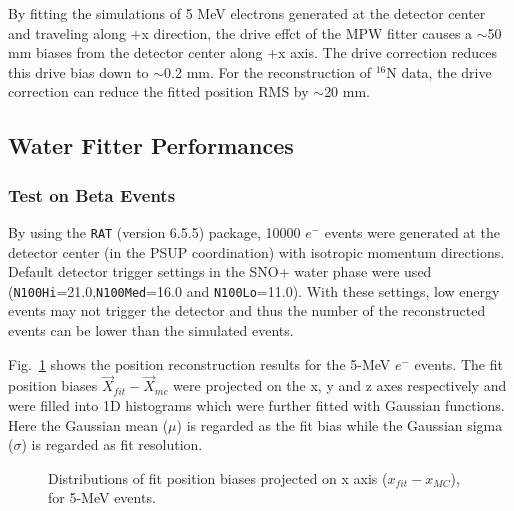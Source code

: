 By fitting the simulations of 5 MeV electrons generated at the detector center and traveling along +x direction, the drive effct of the MPW fitter causes a $\sim$50 mm biases from the detector center along +x axis. The drive correction reduces this drive bias down to $\sim$0.2 mm. For the reconstruction of $^{16}$N data, the drive correction can reduce the fitted position RMS by $\sim$20 mm.

\subsection{Water Fitter Performances}
\subsubsection{Test on Beta Events}
By using the \texttt{RAT} (version 6.5.5) package, 10000 $e^-$ events were generated at the detector center (in the PSUP coordination) with isotropic momentum directions. Default detector trigger settings in the SNO+ water phase were used (\texttt{N100Hi}=21.0,\texttt{N100Med}=16.0 and \texttt{N100Lo}=11.0). With these settings, low energy events may not trigger the detector and thus the number of the reconstructed events can be lower than the simulated events.

Fig.~\ref{fig:5MeVbeta_center_water} shows the position reconstruction results for the 5-MeV $e^-$ events. The fit position biases $\vec{X}_{fit}-\vec{X}_{mc}$ were projected on the x, y and z axes respectively and were filled into 1D histograms which were further fitted with Gaussian functions. Here the Gaussian mean ($\mu$) is regarded as the fit bias while the Gaussian sigma ($\sigma$) is regarded as fit resolution.
\begin{figure}[htbp]
	\centering \label{fig:5MeVbeta_center_water}
	\caption{Distributions of fit position biases projected on x axis ($x_{fit}-x_{MC}$), for 5-MeV events.}
\end{figure}

